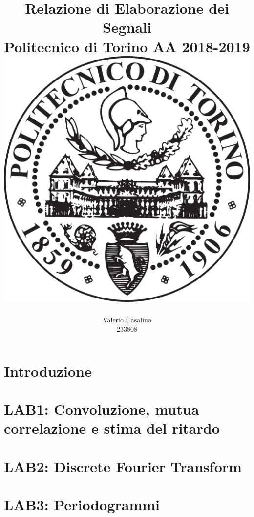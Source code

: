 \documentclass[12pt, openany, a4paper]{report}
\author{
\LARGE
Valerio Casalino \\ 
\LARGE
233808 
}
\title{ 
\Huge
\textbf{Relazione di Elaborazione dei Segnali} \\ 
\LARGE
Politecnico di Torino AA 2018-2019 \\
\vspace*{2cm} \includegraphics[width=.5\textwidth]{images/logo.png}
}
\date{}
\begin{document}
\maketitle

\cleardoublepage
\tableofcontents

\chapter{Introduzione}


\chapter{LAB1: Convoluzione, mutua correlazione e stima del ritardo}


\chapter{LAB2: Discrete Fourier Transform}


\chapter{LAB3: Periodogrammi}

\end{document}
